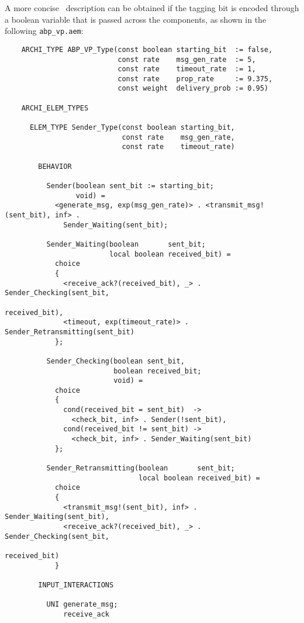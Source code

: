 A more concise \aemilia\ description can be obtained if the tagging bit is encoded through a boolean
variable that is passed across the components, as shown in the following {\tt abp\_vp.aem}:

	\begin{verbatim}
    ARCHI_TYPE ABP_VP_Type(const boolean starting_bit  := false,
                           const rate    msg_gen_rate  := 5,
                           const rate    timeout_rate  := 1,
                           const rate    prop_rate     := 9.375,
                           const weight  delivery_prob := 0.95)

    ARCHI_ELEM_TYPES

      ELEM_TYPE Sender_Type(const boolean starting_bit,
                            const rate    msg_gen_rate,
                            const rate    timeout_rate)

        BEHAVIOR

          Sender(boolean sent_bit := starting_bit;
                 void) =
            <generate_msg, exp(msg_gen_rate)> . <transmit_msg!(sent_bit), inf> .
              Sender_Waiting(sent_bit);

          Sender_Waiting(boolean       sent_bit;
                         local boolean received_bit) =
            choice
            {
              <receive_ack?(received_bit), _> . Sender_Checking(sent_bit,
                                                                received_bit),
              <timeout, exp(timeout_rate)> . Sender_Retransmitting(sent_bit)
            };

          Sender_Checking(boolean sent_bit,
                          boolean received_bit;
                          void) =
            choice
            {
              cond(received_bit = sent_bit)  ->
                <check_bit, inf> . Sender(!sent_bit),
              cond(received_bit != sent_bit) ->
                <check_bit, inf> . Sender_Waiting(sent_bit)
            };

          Sender_Retransmitting(boolean       sent_bit;
                                local boolean received_bit) =
            choice
            {
              <transmit_msg!(sent_bit), inf> . Sender_Waiting(sent_bit),
              <receive_ack?(received_bit), _> . Sender_Checking(sent_bit,
                                                                received_bit)
            }

        INPUT_INTERACTIONS

          UNI generate_msg;
              receive_ack


\end{verbatim}
